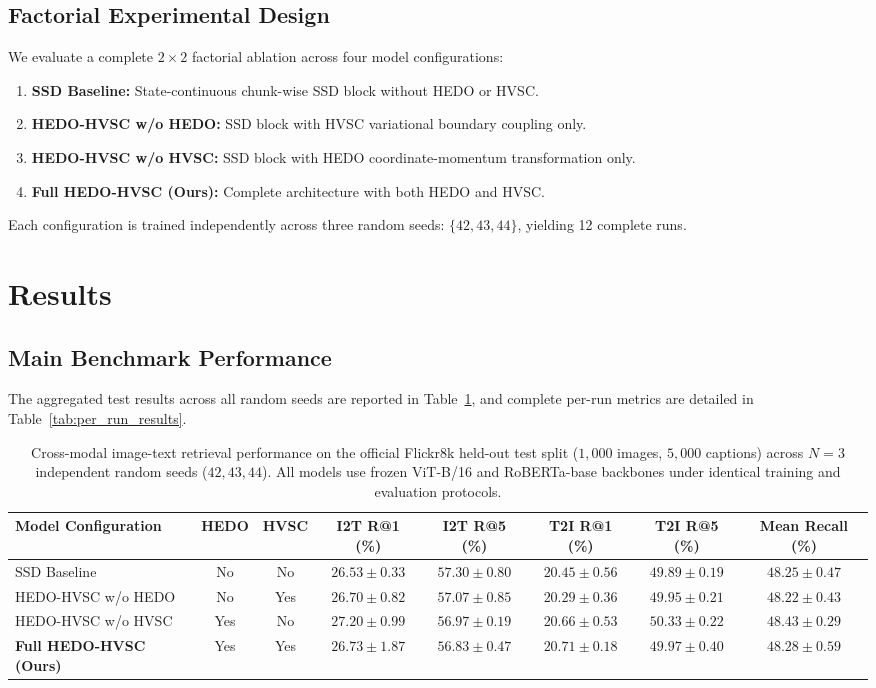 \documentclass[journal]{IEEEtran}
\begin{document}
\subsection{Factorial Experimental Design}
We evaluate a complete $2 \times 2$ factorial ablation across four model configurations:
\begin{enumerate}
    \item \textbf{SSD Baseline:} State-continuous chunk-wise SSD block without HEDO or HVSC.
    \item \textbf{HEDO-HVSC w/o HEDO:} SSD block with HVSC variational boundary coupling only.
    \item \textbf{HEDO-HVSC w/o HVSC:} SSD block with HEDO coordinate-momentum transformation only.
    \item \textbf{Full HEDO-HVSC (Ours):} Complete architecture with both HEDO and HVSC.
\end{enumerate}
Each configuration is trained independently across three random seeds: $\{42, 43, 44\}$, yielding 12 complete runs.

\section{Results}
\label{sec:results}

\subsection{Main Benchmark Performance}
The aggregated test results across all random seeds are reported in Table~\ref{tab:main_results}, and complete per-run metrics are detailed in Table~\ref{tab:per_run_results}.

\begin{table}[t]
\centering
\caption{Cross-modal image-text retrieval performance on the official Flickr8k held-out test split ($1{,}000$ images, $5{,}000$ captions) across $N=3$ independent random seeds ($42, 43, 44$). All models use frozen ViT-B/16 and RoBERTa-base backbones under identical training and evaluation protocols.}
\label{tab:main_results}
\begin{tabular}{lccccccc}
\toprule
\textbf{Model Configuration} & \textbf{HEDO} & \textbf{HVSC} & \textbf{I2T R@1 (\%)} & \textbf{I2T R@5 (\%)} & \textbf{T2I R@1 (\%)} & \textbf{T2I R@5 (\%)} & \textbf{Mean Recall (\%)} \\
\midrule
SSD Baseline & No & No & $26.53 \pm 0.33$ & $57.30 \pm 0.80$ & $20.45 \pm 0.56$ & $49.89 \pm 0.19$ & $48.25 \pm 0.47$ \\
HEDO-HVSC w/o HEDO & No & Yes & $26.70 \pm 0.82$ & $57.07 \pm 0.85$ & $20.29 \pm 0.36$ & $49.95 \pm 0.21$ & $48.22 \pm 0.43$ \\
HEDO-HVSC w/o HVSC & Yes & No & $\mathbf{27.20 \pm 0.99}$ & $56.97 \pm 0.19$ & $20.66 \pm 0.53$ & $\mathbf{50.33 \pm 0.22}$ & $\mathbf{48.43 \pm 0.29}$ \\
\textbf{Full HEDO-HVSC (Ours)} & Yes & Yes & $26.73 \pm 1.87$ & $\mathbf{56.83 \pm 0.47}$ & $\mathbf{20.71 \pm 0.18}$ & $49.97 \pm 0.40$ & $\mathbf{48.28 \pm 0.59}$ \\
\bottomrule
\end{tabular}
\end{table}
\end{document}
